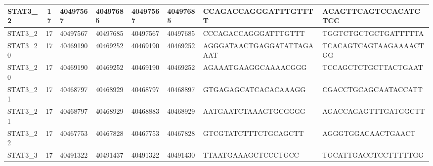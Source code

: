 \begin{landscape}
\begin{longtable}{| p{} | p{} | p{} | p{} | p{} | p{} | p{} | p{} |}
\multicolumn{1}{|l|}{STAT3\_2}   & \multicolumn{1}{c|}{17} & \multicolumn{1}{l|}{40497567}  & \multicolumn{1}{l|}{40497685}  & \multicolumn{1}{l|}{40497567}  & \multicolumn{1}{l|}{40497685}  & \multicolumn{1}{l|}{CCAGACCAGGGATTTGTTTT}            & \multicolumn{1}{l|}{ACAGTTCAGTCCACATCTCC}          \\ \hline
\multicolumn{1}{|l|}{STAT3\_2}   & \multicolumn{1}{c|}{17} & \multicolumn{1}{l|}{40497567}  & \multicolumn{1}{l|}{40497685}  & \multicolumn{1}{l|}{40497567}  & \multicolumn{1}{l|}{40497685}  & \multicolumn{1}{l|}{CCCAGACCAGGGATTTGTTT}            & \multicolumn{1}{l|}{TGGTCTGCTGCTGATTTTTA}          \\ \hline
\multicolumn{1}{|l|}{STAT3\_20}  & \multicolumn{1}{c|}{17} & \multicolumn{1}{l|}{40469190}  & \multicolumn{1}{l|}{40469252}  & \multicolumn{1}{l|}{40469190}  & \multicolumn{1}{l|}{40469252}  & \multicolumn{1}{l|}{AGGGATAACTGAGGATATTAGAAAT}       & \multicolumn{1}{l|}{TCACAGTCAGTAAGAAAACTGG}        \\ \hline
\multicolumn{1}{|l|}{STAT3\_20}  & \multicolumn{1}{c|}{17} & \multicolumn{1}{l|}{40469190}  & \multicolumn{1}{l|}{40469252}  & \multicolumn{1}{l|}{40469190}  & \multicolumn{1}{l|}{40469252}  & \multicolumn{1}{l|}{AGAAATGAAGGCAAAACGGG}            & \multicolumn{1}{l|}{TCCAGCTCTGCTTACTGAAT}          \\ \hline
\multicolumn{1}{|l|}{STAT3\_21}  & \multicolumn{1}{c|}{17} & \multicolumn{1}{l|}{40468797}  & \multicolumn{1}{l|}{40468929}  & \multicolumn{1}{l|}{40468797}  & \multicolumn{1}{l|}{40468897}  & \multicolumn{1}{l|}{GTGAGAGCATCACACAAAGG}            & \multicolumn{1}{l|}{CGACCTGCAGCAATACCATT}          \\ \hline
\multicolumn{1}{|l|}{STAT3\_21}  & \multicolumn{1}{c|}{17} & \multicolumn{1}{l|}{40468797}  & \multicolumn{1}{l|}{40468929}  & \multicolumn{1}{l|}{40468883}  & \multicolumn{1}{l|}{40468929}  & \multicolumn{1}{l|}{AATGAATCTAAAGTGCGGGG}            & \multicolumn{1}{l|}{AGACCAGAGTTTGATGGCTT}          \\ \hline
\multicolumn{1}{|l|}{STAT3\_22}  & \multicolumn{1}{c|}{17} & \multicolumn{1}{l|}{40467753}  & \multicolumn{1}{l|}{40467828}  & \multicolumn{1}{l|}{40467753}  & \multicolumn{1}{l|}{40467828}  & \multicolumn{1}{l|}{GTCGTATCTTTCTGCAGCTT}            & \multicolumn{1}{l|}{AGGGTGGACAACTGAACT}            \\ \hline
\multicolumn{1}{|l|}{STAT3\_3}   & \multicolumn{1}{c|}{17} & \multicolumn{1}{l|}{40491322}  & \multicolumn{1}{l|}{40491437}  & \multicolumn{1}{l|}{40491322}  & \multicolumn{1}{l|}{40491430}  & \multicolumn{1}{l|}{TTAATGAAAGCTCCCTGCC}             & \multicolumn{1}{l|}{TGCATTGACCTCCTTTTTGG}          \\ \hline

\end{longtable}
\end{landscape}
